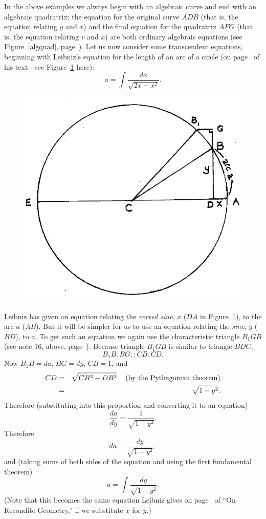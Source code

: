 \documentclass[twoside,openright]{article}
\newlength{\oldjot}
\begin{document}
\label{begsin} In the above examples we always begin with an algebraic curve and end with an algebraic quadratrix:  the equation for the original curve $ADB$ (that is, the equation relating $y$ and $x$) and the final equation for the quadratrix $AFG$ (that is, the equation relating $v$ and $x$) are both ordinary algebraic equations (see Figure~\ref{algquad}, page~\pageref{algquad}). Let us now consider some transcendent equations, beginning with Leibniz's equation for the length of an arc of a circle (on page~\pageref{lcircarc} of his text---see Figure~\ref{circarc2} here):
$$a =  \int \!\frac{dx}{\sqrt{2x-x^2}}.$$
\begin{figure}[htp]
\begin{center}
\includegraphics[width=.65\textwidth]{fig/Figure42}
\caption{}
\label{circarc2}
\vspace{-10pt}
\end{center}
\end{figure} 

Leibniz has given an equation relating the {\em versed sine}, $x$
($DA$ in Figure~\ref{circarc2}), to the arc $a$ ($AB$).  But it will
be simpler for us to use an equation relating the {\em sine}, $y$
($BD$), to $a$.  To get such an equation we again use the
characteristic triangle $B_1GB$ (see note 16, above,
page~\pageref{crg16}).  Because triangle $B_1GB$ is similar to
triangle $BDC$,
$$B_1B \!:\! BG :: CB \!:\!CD.$$
Now $B_1B = da$, $BG = dy$, $CB = 1$, and 
\setlength{\jot}{1.5ex}
\begin{eqnarray*}
CD & = & \sqrt{CB^2 - DB^2} \mbox{\hspace{2ex} (by the Pythagorean theorem)}\\
& = & \sqrt{1 - y^2}.
\end{eqnarray*}
\setlength{\jot}{\oldjot}
Therefore (substituting into this proportion and converting it to an equation)
$$\frac{da}{dy} = \frac{1}{\sqrt{1-y^2}}.$$
Therefore
$$da = \frac{dy}{\sqrt{1-y^2}},$$
and (taking sums of both sides of the equation and using the first fundamental theorem)
$$a = \int\!\frac{dy}{\sqrt{1-y^2}}.$$
(Note that this becomes the same equation Leibniz gives on page~\pageref{rgcircarc} of ``On Recondite Geometry," if we substitute $x$ for $y$.)
\end{document}
